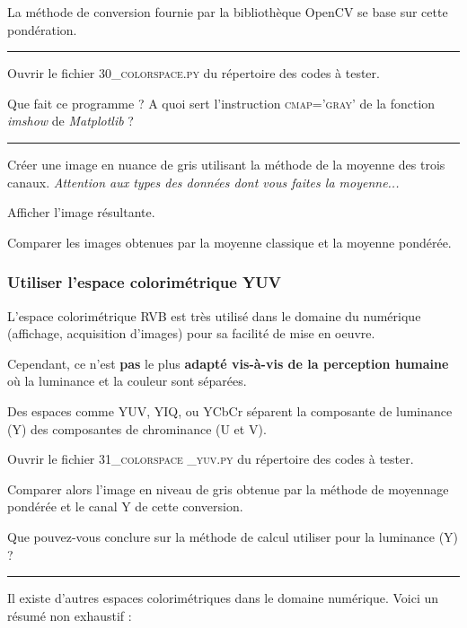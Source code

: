 \documentclass[a4paper,11pt,titlepage]{article} %
\begin{document}
La méthode de conversion fournie par la bibliothèque OpenCV se base sur cette pondération.

\noindent \rule{\linewidth}{1pt}


\Manip Ouvrir le fichier \textsc{30\_colorspace.py} du répertoire des codes à tester.

\Quest Que fait ce programme ? A quoi sert l'instruction \textsc{cmap='gray'} de la fonction \textit{imshow} de \textit{Matplotlib} ?

\noindent \rule{\linewidth}{1pt}

\Manip Créer une image en nuance de gris utilisant la méthode de la moyenne des trois canaux. \textit{Attention aux types des données dont vous faites la moyenne...}

\Manip Afficher l'image résultante.

\Manip Comparer les images obtenues par la moyenne classique et la moyenne pondérée.


\subsubsection{Utiliser l'espace colorimétrique YUV}

L'espace colorimétrique RVB est très utilisé dans le domaine du numérique (affichage, acquisition d'images) pour sa facilité de mise en oeuvre.

Cependant, ce n'est \textbf{pas} le plus \textbf{adapté vis-à-vis de la perception humaine} où la luminance et la couleur sont séparées.

Des espaces comme YUV, YIQ, ou YCbCr séparent la composante de luminance (Y) des composantes de chrominance (U et V).

\Manip Ouvrir le fichier \textsc{31\_colorspace \_yuv.py} du répertoire des codes à tester.

\Manip Comparer alors l'image en niveau de gris obtenue par la méthode de moyennage pondérée et le canal Y de cette conversion.

\Quest Que pouvez-vous conclure sur la méthode de calcul utiliser pour la luminance (Y) ?

\medskip

\noindent \rule{\linewidth}{1pt}

Il existe d'autres espaces colorimétriques dans le domaine numérique. Voici un résumé non exhaustif :
\end{document}
